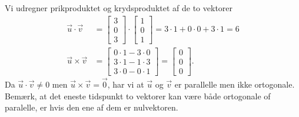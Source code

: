 \begin{enumerate}
Vi udregner prikproduktet og krydsproduktet af de to vektorer
\begin{align*}
\vec{u} \cdot \vec{v} &= \begin{bmatrix} 3 \\ 0 \\ 3 \end{bmatrix}\cdot  \begin{bmatrix} 1 \\ 0 \\ 1 \end{bmatrix} = 3 \cdot 1 + 0 \cdot 0 + 3 \cdot 1 = 6 \\
\vec{u} \times \vec{v} &= \begin{bmatrix}
0 \cdot 1 - 3 \cdot 0 \\
3 \cdot 1 - 1 \cdot 3 \\
3 \cdot 0 - 0 \cdot 1
\end{bmatrix}
= \begin{bmatrix}
0 \\
0 \\
0
\end{bmatrix}.
\end{align*}
Da $\vec{u} \cdot \vec{v} \neq 0$ men $\vec{u} \times \vec{v}= \vec{0}$, har vi at $\vec{u}$ og $\vec{v}$ er parallelle men ikke ortogonale. Bemærk, at det eneste tidspunkt to vektorer kan være både ortogonale of paralelle, er hvis den ene af dem er nulvektoren.
\end{enumerate}